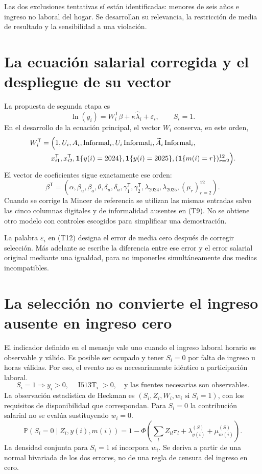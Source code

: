 \documentclass[11pt,a4paper]{article}
\newcommand{\Prob}{\mathbb P}
\begin{document}
Las dos exclusiones tentativas sí están identificadas: menores de seis años e ingreso no laboral del hogar. Se desarrollan su relevancia, la restricción de media de resultado y la sensibilidad a una violación.

\clearpage
\section{La ecuación salarial corregida y el despliegue de su vector}

La propuesta de segunda etapa es
\[
\ln(y_i)=W_i^{\mathsf T}\beta+\kappa\widehat\lambda_i+\varepsilon_i,
\qquad S_i=1. \tag{T12}
\]
En el desarrollo de la ecuación principal, el vector $W_i$ conserva, en este orden,
\[
\begin{aligned}
W_i^{\mathsf T}={}&\Bigl(
1,U_i,A_i,\operatorname{Informal}_i,
U_i\operatorname{Informal}_i,\widetilde A_i\operatorname{Informal}_i,\\
&
x_{i1}^{\mathsf T},x_{i2}^{\mathsf T},
\mathbf1\{y(i)=2024\},\mathbf1\{y(i)=2025\},
(\mathbf1\{m(i)=r\})_{r=2}^{12}
\Bigr).
\end{aligned}
\]
El vector de coeficientes sigue exactamente ese orden:
\[
\beta^{\mathsf T}=
\left(
\alpha,\beta_u,\beta_a,\theta,\delta_u,\delta_a,
\gamma_1^{\mathsf T},\gamma_2^{\mathsf T},
\lambda_{2024},\lambda_{2025},(\mu_r)_{r=2}^{12}
\right).
\]
Cuando se corrige la Mincer de referencia se utilizan las mismas entradas salvo las cinco columnas digitales y de informalidad ausentes en (T9). No se obtiene otro modelo con controles escogidos para simplificar una demostración.

La palabra $\varepsilon_i$ en (T12) designa el error de media cero después de corregir selección. Más adelante se escribe la diferencia entre ese error y el error salarial original mediante una igualdad, para no imponerles simultáneamente dos medias incompatibles.

\clearpage
\section{La selección no convierte el ingreso ausente en ingreso cero}

El indicador definido en el mensaje vale uno cuando el ingreso laboral horario es observable y válido. Es posible ser ocupado y tener $S_i=0$ por falta de ingreso u horas válidas. Por eso, el evento no es necesariamente idéntico a participación laboral.
\[
S_i=1\Longrightarrow y_i>0,\quad \operatorname{I513T}_i>0,
\quad\text{y las fuentes necesarias son observables}.
\]
La observación estadística de Heckman es $(S_i,Z_i,W_i,w_i\text{ si }S_i=1)$, con los requisitos de disponibilidad que correspondan. Para $S_i=0$ la contribución salarial no se evalúa sustituyendo $w_i=0$.
\[
\Prob(S_i=0\mid Z_i,y(i),m(i))
=1-\Phi\left(\sum_lZ_{il}\pi_l+\lambda_{y(i)}^{(S)}+\mu_{m(i)}^{(S)}\right).
\]
La densidad conjunta para $S_i=1$ sí incorpora $w_i$. Se deriva a partir de una normal bivariada de los dos errores, no de una regla de censura del ingreso en cero.
\end{document}
